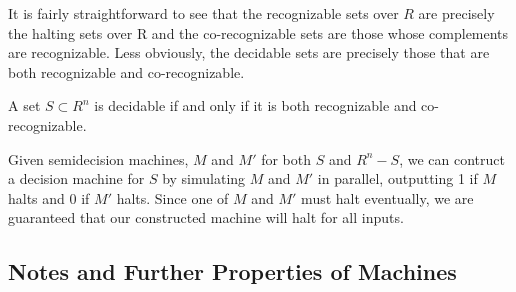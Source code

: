It is fairly straightforward to see that the recognizable sets over
$R$ are precisely the halting sets over R and the co-recognizable sets
are those whose complements are recognizable. Less obviously, the
decidable sets are precisely those that are both recognizable and
co-recognizable.

\begin{proposition}{A set $S \subset R^n$ is decidable if and only if it is
  both recognizable and co-recognizable.}
\end{proposition}
\begin{proofsketch}
  
  Given semidecision machines, $M$ and $M'$ for both $S$ and $R^n -
  S$, we can contruct a decision machine for $S$ by simulating $M$ and
  $M'$ in parallel, outputting 1 if $M$ halts and 0 if $M'$ halts.
  Since one of $M$ and $M'$ must halt eventually, we are guaranteed
  that our constructed machine will halt for all inputs.


\end{proofsketch}

\subsection{Notes and Further Properties of Machines}

